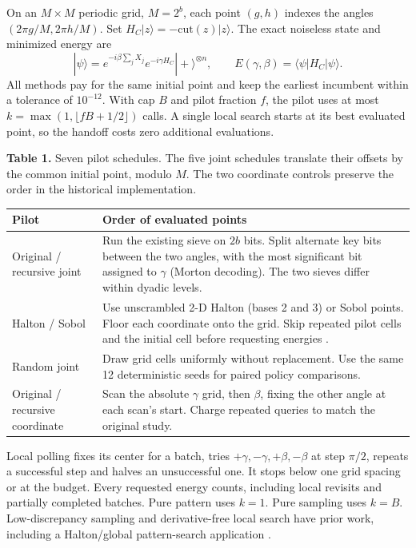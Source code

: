\documentclass[11pt]{article}
\newcommand{\sect}[2]{\noindent{\sffamily\bfseries\large\color{ink}#1\hspace{.6em}#2}\par\smallskip}
\newcommand{\tabcaption}[2]{{\small\textbf{Table #1.} #2\par}}
\begin{document}
\newpage
\sect{2}{A common optimizer and a common budget}
On an $M\times M$ periodic grid, $M=2^b$, each point $(g,h)$ indexes the angles $(2\pi g/M,2\pi h/M)$. Set $H_C|z\rangle=-\mathrm{cut}(z)|z\rangle$. The exact noiseless state and minimized energy are
\[
  |\psi\rangle=e^{-i\beta\sum_jX_j}e^{-i\gamma H_C}|+\rangle^{\otimes n},
  \qquad E(\gamma,\beta)=\langle\psi|H_C|\psi\rangle.
\]
All methods pay for the same initial point and keep the earliest incumbent within a tolerance of $10^{-12}$. With cap $B$ and pilot fraction $f$, the pilot uses at most $k=\max(1,\lfloor fB+1/2\rfloor)$ calls. A single local search starts at its best evaluated point, so the handoff costs zero additional evaluations.

\tabcaption{1}{Seven pilot schedules. The five joint schedules translate their offsets by the common initial point, modulo $M$. The two coordinate controls preserve the order in the historical implementation.}
{\small\begin{tabular}{@{}p{.265\linewidth}p{.675\linewidth}@{}}\toprule
Pilot & Order of evaluated points\\\midrule
Original / recursive joint & Run the existing sieve on $2b$ bits. Split alternate key bits between the two angles, with the most significant bit assigned to $\gamma$ (Morton decoding). The two sieves differ within dyadic levels.\\
Halton / Sobol & Use unscrambled 2-D Halton (bases 2 and 3) or Sobol points. Floor each coordinate onto the grid. Skip repeated pilot cells and the initial cell before requesting energies \cite{halton,sobol}.\\
Random joint & Draw grid cells uniformly without replacement. Use the same 12 deterministic seeds for paired policy comparisons.\\
Original / recursive coordinate & Scan the absolute $\gamma$ grid, then $\beta$, fixing the other angle at each scan's start. Charge repeated queries to match the original study.\\\bottomrule
\end{tabular}}

Local polling fixes its center for a batch, tries $+\gamma,-\gamma,+\beta,-\beta$ at step $\pi/2$, repeats a successful step and halves an unsuccessful one. It stops below one grid spacing or at the budget. Every requested energy counts, including local revisits and partially completed batches. Pure pattern uses $k=1$. Pure sampling uses $k=B$. Low-discrepancy sampling and derivative-free local search have prior work, including a Halton/global pattern-search application \cite{torczon,wolniak}.
\end{document}
